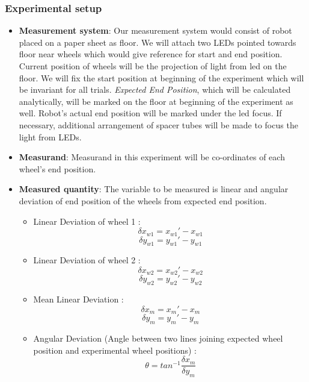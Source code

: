 \documentclass[11pt,a4paper,openright,twoside]{extreport}
\begin{document}
\subsubsection*{Experimental setup}
\begin{itemize}
\item \textbf{Measurement system}: Our measurement system would consist of robot placed on a paper sheet as floor. We will attach two LEDs pointed towards floor near wheels which would give reference for start and end position. Current position of wheels will be the projection of light from led on the floor. We will fix the start position at beginning of the experiment which will be invariant for all trials. \textit{Expected End Position}, which will be calculated analytically, will be marked on the floor at beginning of the experiment as well. Robot's actual end position will be marked under the led focus. If necessary, additional arrangement of spacer tubes will be made to focus the light from LEDs. 

\item \textbf{Measurand}: Measurand in this experiment will be co-ordinates of each wheel's end position. 

\item \textbf{Measured quantity}: The variable to be measured is linear and angular deviation of end position of the wheels from expected end position. 

\begin{itemize}
	\item Linear Deviation of wheel 1 : 
	$$\delta x_{w1} = x_{w1}' - x_{w1}$$
	$$\delta y_{w1} = y_{w1}' - y_{w1}$$
	\item Linear Deviation of wheel 2 : 
	$$\delta x_{w2} = x_{w2}' - x_{w2}$$
	$$\delta y_{w2} = y_{w2}' - y_{w2}$$
	\item Mean Linear Deviation :  
	$$\delta x_{m} = x_{m}' - x_{m}$$
	$$\delta y_{m} = y_{m}' - y_{m}$$
	\item Angular Deviation (Angle between two lines joining expected wheel position and experimental wheel positions) : 
	$$\theta = tan^{-1}\frac{\delta x_{m}}{\delta y_{m}}$$
	
\end{itemize}





\end{itemize}
\end{document}

